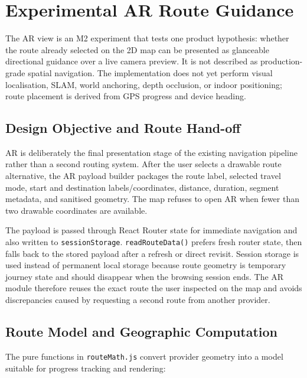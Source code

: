 \documentclass[11pt]{article}
\begin{document}
\section*{Experimental AR Route Guidance}

The AR view is an M2 experiment that tests one product hypothesis: whether the route already selected on the 2D map can be presented as glanceable directional guidance over a live camera preview. It is not described as production-grade spatial navigation. The implementation does not yet perform visual localisation, SLAM, world anchoring, depth occlusion, or indoor positioning; route placement is derived from GPS progress and device heading.

\subsection*{Design Objective and Route Hand-off}

AR is deliberately the final presentation stage of the existing navigation pipeline rather than a second routing system. After the user selects a drawable route alternative, the AR payload builder packages the route label, selected travel mode, start and destination labels/coordinates, distance, duration, segment metadata, and sanitised geometry. The map refuses to open AR when fewer than two drawable coordinates are available.

The payload is passed through React Router state for immediate navigation and also written to \texttt{sessionStorage}. \texttt{readRouteData()} prefers fresh router state, then falls back to the stored payload after a refresh or direct revisit. Session storage is used instead of permanent local storage because route geometry is temporary journey state and should disappear when the browsing session ends. The AR module therefore reuses the exact route the user inspected on the map and avoids discrepancies caused by requesting a second route from another provider.

\subsection*{Route Model and Geographic Computation}

The pure functions in \texttt{routeMath.js} convert provider geometry into a model suitable for progress tracking and rendering:
\end{document}
